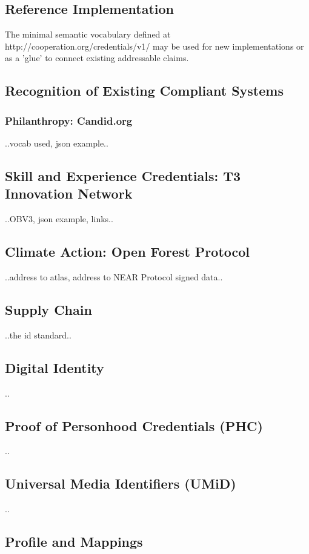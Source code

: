 \documentclass[11pt]{article}
\begin{document}
\subsection{Reference Implementation}
The minimal semantic vocabulary defined at http://cooperation.org/credentials/v1/ may be used for new implementations or as a 'glue' to connect existing addressable claims.
\subsection{Recognition of Existing Compliant Systems}
\subsubsection{Philanthropy: Candid.org}
..vocab used, json example..

\subsection{Skill and Experience Credentials: T3 Innovation Network}
..OBV3, json example, links..

\subsection{Climate Action: Open Forest Protocol}

..address to atlas, address to NEAR Protocol signed data..

\subsection{Supply Chain}
..the id standard..

\subsection{Digital Identity}
..

\subsection{Proof of Personhood Credentials (PHC)}
..

\subsection{Universal Media Identifiers (UMiD)}
..

\subsection{Profile and Mappings}
\end{document}
